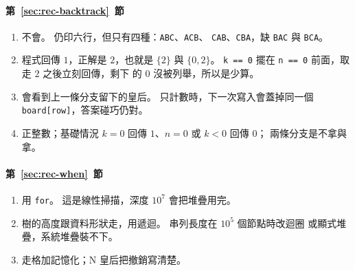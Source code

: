 \paragraph{第~\ref{sec:rec-backtrack}~節}
\begin{enumerate}
\item 不會。 仍印六行，但只有四種：\texttt{ABC}、\texttt{ACB}、
\texttt{CAB}、\texttt{CBA}，缺 \texttt{BAC} 與 \texttt{BCA}。
\item 程式回傳 $1$，正解是 $2$，也就是 $\{2\}$ 與 $\{0, 2\}$。
\texttt{k == 0} 擺在 \texttt{n == 0} 前面，取走 $2$ 之後立刻回傳，剩下
的 $0$ 沒被列舉，所以是少算。
\item 會看到上一條分支留下的皇后。 只計數時，下一次寫入會蓋掉同一個
\texttt{board[row]}，答案碰巧仍對。
\item 正整數；基礎情況 $k = 0$ 回傳 $1$、$n = 0$ 或 $k < 0$ 回傳 $0$；
兩條分支是不拿與拿。
\end{enumerate}

\paragraph{第~\ref{sec:rec-when}~節}
\begin{enumerate}
\item 用 \texttt{for}。 這是線性掃描，深度 $10^7$ 會把堆疊用完。
\item 樹的高度跟資料形狀走，用遞迴。 串列長度在 $10^5$ 個節點時改迴圈
或顯式堆疊，系統堆疊裝不下。
\item 走格加記憶化；N 皇后把撤銷寫清楚。
\end{enumerate}
